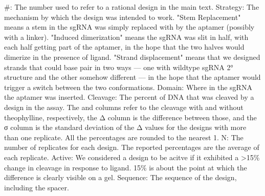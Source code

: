 \documentclass[10pt,oneside]{article}
\begin{document}
 \#: The number used to refer to a rational design in the main text.
 Strategy: The mechanism by which the design was intended to work.  "Stem 
 Replacement" means a stem in the sgRNA was simply replaced with by the aptamer 
 (possibly with a linker).  "Induced dimerization" means the sgRNA was slit in 
 half, with each half getting part of the aptamer, in the hope that the two 
 halves would dimerize in the presence of ligand.  "Strand displacement" means 
 that we designed strands that could base pair in two ways --- one with wildtype 
 sgRNA 2° structure and the other somehow different --- in the hope that the 
 aptamer would trigger a switch between the two conformations.
 Domain: Where in the sgRNA the aptamer was inserted.  
 Cleavage: The percent of DNA that was cleaved by a design in the \invitro{} 
 assay.  The \apo{} and \holo{} columns refer to the cleavage with and without 
 theophylline, respectively, the Δ column is the difference between those, and 
 the σ column is the standard deviation of the Δ values for the designs with 
 more than one replicate.  All the percentages are rounded to the nearest 1.
 N: The number of replicates for each design.  The reported percentages are the 
 average of each replicate.
 Active: We considered a design to be acitve if it exhibited a >15\% change in 
 cleavage in response to ligand.  15\% is about the point at which the 
 difference is clearly visible on a gel.
 Sequence: The sequence of the design, including the spacer.




\printbibliography[title=References]
\end{document}
